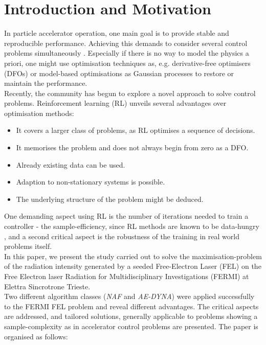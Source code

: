 \documentclass[
reprint,
amsmath,amssymb,amsfonts,clevref,
aps,
prstab,
]{revtex4-2}
\begin{document}
	\section{Introduction and Motivation}
	In particle accelerator operation, one main goal is to provide stable and reproducible performance. Achieving this demands to consider several control problems simultaneously \cite{Kain2020}. Especially if there is no way to model the physics a priori, one might use optimisation techniques as, e.g. derivative-free optimisers (DFOs) \cite{Huang2013,Bruchon2017,Scheinker2020,Hirlaender2019,Welsch2015,Albright2019} or model-based optimisations as Gaussian processes \cite{Hanuka2020,Roussel2020} to restore or maintain the performance.\\
	 Recently, the community has begun to explore a novel approach to solve control problems. Reinforcement learning (RL) \cite{Bruchon2020,Bruchon2019,Kain2020,Pang2020} unveils several advantages over optimisation methods:
	\begin{itemize}
		\item It covers a larger class of problems, as RL optimises a sequence of decisions.
		\item It memorises the problem and does not always begin from zero as a DFO.
		\item Already existing data can be used.
		\item Adaption to non-stationary systems is possible.
		\item The underlying structure of the problem might be deduced.
	\end{itemize}
	One demanding aspect using RL is the number of iterations needed to train a controller - the sample-efficiency, since RL methods are known to be data-hungry \cite{Sutton2018}, and a second critical aspect is the robustness of the training in real world problems itself.\\
	In this paper, we present the study carried out to solve the maximisation-problem of the radiation intensity generated by a seeded Free-Electron Laser (FEL) on the Free Electron laser Radiation for Multidisciplinary Investigations (FERMI) at Elettra Sincrotrone Trieste.\\
	 Two different algorithm classes (\emph{NAF} and \emph{AE-DYNA}) were applied successfully to the FERMI FEL problem and reveal different advantages. The critical aspects are addressed, and tailored solutions, generally applicable to problems showing a sample-complexity as in accelerator control problems are presented.
	The paper is organised as follows:
\end{document}
